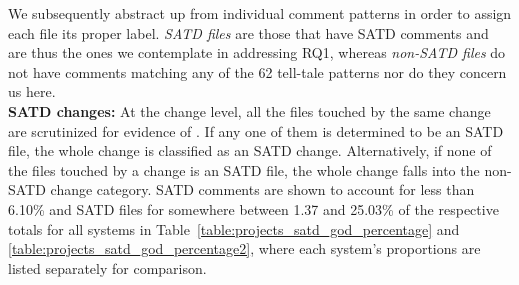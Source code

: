 We subsequently abstract up from individual comment patterns in order to assign each file its proper label. {\em SATD files} are those that have SATD comments and are thus the ones we contemplate in addressing RQ1, whereas {\em non-SATD files} do not have comments matching any of the 62 tell-tale patterns nor do they concern us here.\\


\noindent\textbf{SATD changes:}
At the change level, all the files touched by the same change are scrutinized for evidence of \SATD. If any one of them is determined to be an SATD file, the whole change is classified as an SATD change. Alternatively, if none of the files touched by a change is an SATD file, the whole change falls into the non-SATD change category. SATD comments are shown to account for less than 6.10\% and SATD files for somewhere between 1.37 and 25.03\% of the respective totals for all systems in Table~\ref{table:projects_satd_god_percentage} and \ref{table:projects_satd_god_percentage2}, where each system's proportions are listed separately for comparison.

